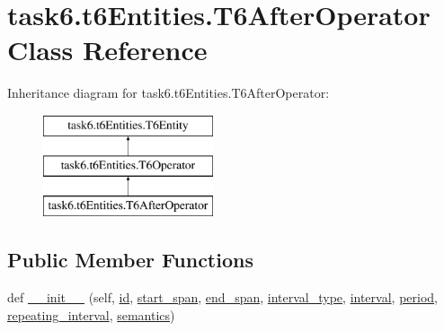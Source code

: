 \hypertarget{classtask6_1_1t6Entities_1_1T6AfterOperator}{}\section{task6.\+t6\+Entities.\+T6\+After\+Operator Class Reference}
\label{classtask6_1_1t6Entities_1_1T6AfterOperator}
Inheritance diagram for task6.\+t6\+Entities.\+T6\+After\+Operator\+:\begin{figure}[H]
\begin{center}
\leavevmode
\includegraphics[height=3.000000cm]{classtask6_1_1t6Entities_1_1T6AfterOperator}
\end{center}
\end{figure}
\subsection*{Public Member Functions}
\begin{DoxyCompactItemize}
\item 
def \hyperlink{classtask6_1_1t6Entities_1_1T6AfterOperator_aec577149362a92ed1cf1e5bbdc0521c1}{\+\_\+\+\_\+init\+\_\+\+\_\+} (self, \hyperlink{classtask6_1_1t6Entities_1_1T6Entity_afeeced8134bb3ebe0cfecc64d0ab46a4}{id}, \hyperlink{classtask6_1_1t6Entities_1_1T6Entity_a52779e9af8864dc98e8b02fc5b9b041a}{start\+\_\+span}, \hyperlink{classtask6_1_1t6Entities_1_1T6Entity_aeb402200b156cd9562c5111dfe777b98}{end\+\_\+span}, \hyperlink{classtask6_1_1t6Entities_1_1T6AfterOperator_a4cecc35aaca42a517e7a8c3a23062b73}{interval\+\_\+type}, \hyperlink{classtask6_1_1t6Entities_1_1T6AfterOperator_a33c6453eb324ed64a62025d823329304}{interval}, \hyperlink{classtask6_1_1t6Entities_1_1T6AfterOperator_abb2b91e9891f20ec388cbc9d6038c3a7}{period}, \hyperlink{classtask6_1_1t6Entities_1_1T6AfterOperator_aa3611005a94f1cbc3867c3e3c9463d24}{repeating\+\_\+interval}, \hyperlink{classtask6_1_1t6Entities_1_1T6AfterOperator_a9a0d8b1907a272fa065b80fdd8a533a8}{semantics})
\end{DoxyCompactItemize}
